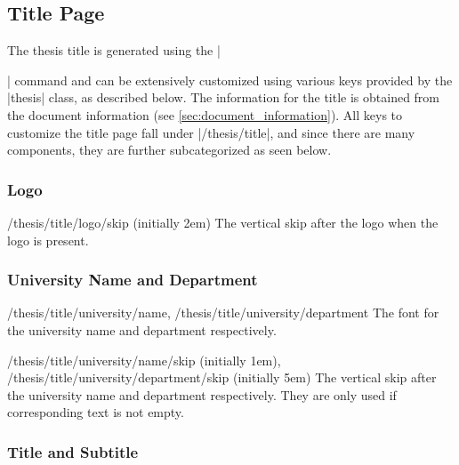 \subsection{Title Page}
\label{subsec:title_page}

The thesis title is generated using the |\maketitle| command and can be
extensively customized using various keys provided by the |thesis| class, as
described below.  The information for the title is obtained from the document
information (see \cref{sec:document_information}).  All keys to customize the
title page fall under |/thesis/title|, and since there are many components, they
are further subcategorized as seen below.

\subsubsection{Logo}
\label{subsubsec:logo}

\begin{key}{/thesis/title/logo/skip (initially 2em)}
  The vertical skip after the logo when the logo is present.
\end{key}

\subsubsection{University Name and Department}
\label{subsubsec:university_logo_name_and_department}

\begin{fontkeylist}{/thesis/title/university/name, /thesis/title/university/department}
  The font for the university name and department respectively.
\end{fontkeylist}

\begin{keylist}{
    /thesis/title/university/name/skip (initially 1em),
    /thesis/title/university/department/skip (initially 5em)}
  The vertical skip after the university name and department respectively.  They
  are only used if corresponding text is not empty.
\end{keylist}

\subsubsection{Title and Subtitle}
\label{subsubsec:title_and_subtitle}

